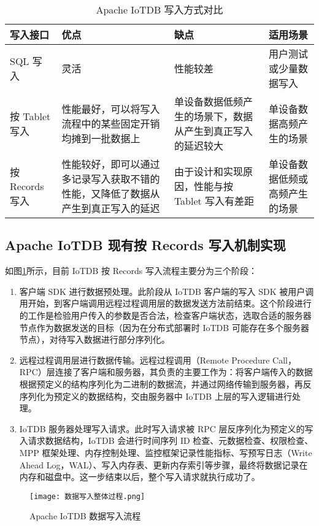 \begin{table}
  \centering
  \caption{Apache IoTDB 写入方式对比}
  \begin{tabular}{lp{3.5cm}p{3.5cm}p{3.5cm}}
    \toprule
    写入接口  & 优点 & 缺点 & 适用场景 \\
    \midrule
    SQL 写入 & 灵活 & 性能较差 & 用户测试或少量数据写入 \\
    按 Tablet 写入  & 性能最好，可以将写入流程中的某些固定开销均摊到一批数据上 & 单设备数据低频产生的场景下，数据从产生到真正写入的延迟较大 & 单设备数据高频产生的场景\\
    按 Records 写入  & 性能较好，即可以通过多记录写入获取不错的性能，又降低了数据从产生到真正写入的延迟 & 由于设计和实现原因，性能与按 Tablet 写入有差距 & 单设备数据低频或高频产生的场景 \\
    \bottomrule
  \end{tabular}
  \label{tab:iotdbwriteinterfacecompare}
\end{table}

\subsection{Apache IoTDB 现有按 Records 写入机制实现}
如图\ref{fig:iotdb-write-process}所示，目前 IoTDB 按 Records 写入流程主要分为三个阶段：
\begin{enumerate}
  \item 客户端 SDK 进行数据预处理。此阶段从 IoTDB 客户端的写入 SDK 被用户调用开始，到客户端调用远程过程调用层的数据发送方法前结束。这个阶段进行的工作是检验用户传入的参数是否合法，检查客户端状态，选取合适的服务器节点作为数据发送的目标（因为在分布式部署时 IoTDB 可能存在多个服务器节点），对待写入数据进行部分序列化。
  \item 远程过程调用层进行数据传输。远程过程调用（Remote Procedure Call，RPC）层连接了客户端和服务器，其负责的主要工作为：将客户端传入的数据根据预定义的结构序列化为二进制的数据流，并通过网络传输到服务器，再反序列化为预定义的数据结构，交由服务器中 IoTDB 上层的写入逻辑进行处理。
  \item IoTDB 服务器处理写入请求。此时写入请求被 RPC 层反序列化为预定义的写入请求数据结构，IoTDB 会进行时间序列 ID 检查、元数据检查、权限检查、MPP 框架处理、内存控制处理、监控框架记录性能指标、写预写日志（Write Ahead Log，WAL）、写入内存表、更新内存索引等步骤，最终将数据记录在内存和磁盘中。这一步结束以后，整个写入请求就执行成功了。
\end{enumerate}
\begin{figure}
  \centering
  \texttt{[image: 数据写入整体过程.png]}
  \caption{Apache IoTDB 数据写入流程}
  \label{fig:iotdb-write-process}
\end{figure}
